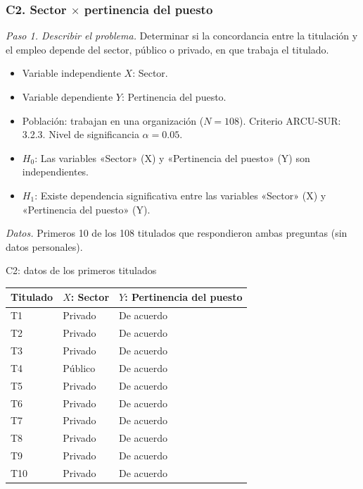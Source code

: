 \subsubsection*{C2. Sector $\times$ pertinencia del puesto}

\textit{Paso 1. Describir el problema.} Determinar si la concordancia entre la titulación y el empleo depende del sector, público o privado, en que trabaja el titulado.

\begin{itemize}[nosep]
  \item Variable independiente $X$: Sector.
  \item Variable dependiente $Y$: Pertinencia del puesto.
  \item Población: trabajan en una organización ($N = 108$). Criterio ARCU-SUR: 3.2.3. Nivel de significancia $\alpha = 0.05$.
  \item $H_0$: Las variables «Sector» (X) y «Pertinencia del puesto» (Y) son independientes.
  \item $H_1$: Existe dependencia significativa entre las variables «Sector» (X) y «Pertinencia del puesto» (Y).
\end{itemize}

\textit{Datos.} Primeros 10 de los 108 titulados que respondieron ambas preguntas (sin datos personales).

\begin{mitabla}{C2: datos de los primeros titulados}
\begin{tabular}{lll}
\toprule
Titulado & $X$: Sector & $Y$: Pertinencia del puesto \\
\midrule
T1 & Privado & De acuerdo \\
T2 & Privado & De acuerdo \\
T3 & Privado & De acuerdo \\
T4 & Público & De acuerdo \\
T5 & Privado & De acuerdo \\
T6 & Privado & De acuerdo \\
T7 & Privado & De acuerdo \\
T8 & Privado & De acuerdo \\
T9 & Privado & De acuerdo \\
T10 & Privado & De acuerdo \\
\bottomrule
\end{tabular}
\end{mitabla}

